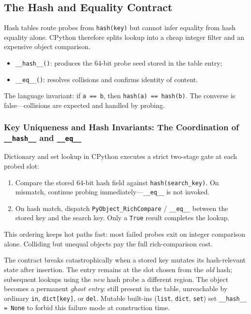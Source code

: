 \subsection{The Hash and Equality Contract}

Hash tables route probes from \texttt{hash(key)} but cannot infer equality from hash equality alone. CPython therefore splits lookup into a cheap integer filter and an expensive object comparison.

\begin{itemize}
    \item \texttt{\_\_hash\_\_()}: produces the 64-bit probe seed stored in the table entry;
    \item \texttt{\_\_eq\_\_()}: resolves collisions and confirms identity of content.
\end{itemize}

The language invariant: if \texttt{a == b}, then \texttt{hash(a) == hash(b)}. The converse is false---collisions are expected and handled by probing.

\subsubsection{Key Uniqueness and Hash Invariants: The Coordination of \texttt{\_\_hash\_\_} and \texttt{\_\_eq\_\_}}

Dictionary and set lookup in CPython executes a strict two-stage gate at each probed slot:

\begin{enumerate}
    \item Compare the stored 64-bit hash field against \texttt{hash(search\_key)}. On mismatch, continue probing immediately---\texttt{\_\_eq\_\_} is not invoked.
    \item On hash match, dispatch \texttt{PyObject\_RichCompare} / \texttt{\_\_eq\_\_} between the stored key and the search key. Only a \texttt{True} result completes the lookup.
\end{enumerate}

This ordering keeps hot paths fast: most failed probes exit on integer comparison alone. Colliding but unequal objects pay the full rich-comparison cost.

The contract breaks catastrophically when a stored key mutates its hash-relevant state after insertion. The entry remains at the slot chosen from the \emph{old} hash; subsequent lookups using the \emph{new} hash probe a different region. The object becomes a permanent \emph{ghost entry}: still present in the table, unreachable by ordinary \texttt{in}, \texttt{dict[key]}, or \texttt{del}. Mutable built-ins (\texttt{list}, \texttt{dict}, \texttt{set}) set \texttt{\_\_hash\_\_ = None} to forbid this failure mode at construction time.

